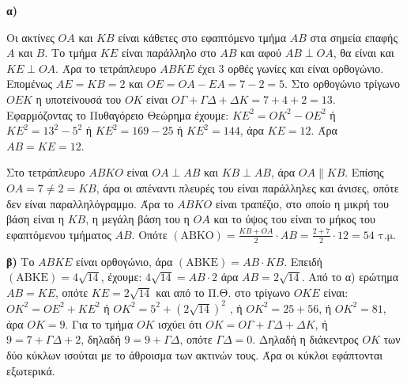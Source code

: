 \textbf{α)}
\begin{rlist}
    \item Οι ακτίνες $OA$ και $KB$ είναι κάθετες στο εφαπτόμενο τμήμα $AB$ στα σημεία επαφής $A$ και $B$. Το τμήμα $KE$ είναι παράλληλο στο $AB$ και αφού $AB \perp OA$, θα είναι και $KE \perp OA$. Άρα το τετράπλευρο $ABKE$ έχει 3 ορθές γωνίες και είναι ορθογώνιο. Επομένως $AE=KB=2$ και $OE=OA-EA=7-2=5$. Στο ορθογώνιο τρίγωνο $OEK$ η υποτείνουσά του $OK$ είναι $O\Gamma+\Gamma\Delta+\Delta K=7+4+2=13$. Εφαρμόζοντας το Πυθαγόρειο Θεώρημα έχουμε: $KE^2=OK^2-OE^2$ ή $KE^2=13^2-5^2$ ή $KE^2=169-25$ ή $KE^2=144$, άρα $KE=12$. Άρα $AB=KE=12$.
    \item Στο τετράπλευρο $ABKO$ είναι $OA \perp AB$ και $KB \perp AB$, άρα $OA \parallel KB$. Επίσης $OA=7 \neq 2=KB$, άρα οι απέναντι πλευρές του είναι παράλληλες και άνισες, οπότε δεν είναι παραλληλόγραμμο. Άρα το $ABKO$ είναι τραπέζιο, στο οποίο η μικρή του βάση είναι η $KB$, η μεγάλη βάση του η $OA$ και το ύψος του είναι το μήκος του εφαπτόμενου τμήματος $AB$. Οπότε $(\text{ABKO}) = \frac{KB+OA}{2} \cdot AB = \frac{2+7}{2} \cdot 12 = 54 \text{ τ.μ.}$
\end{rlist}
\textbf{β)} Το $ABKE$ είναι ορθογώνιο, άρα $(\text{ABKE}) = AB \cdot KB$. Επειδή $(\text{ABKE}) = 4\sqrt{14}$, έχουμε:
$4\sqrt{14} = AB \cdot 2$ άρα $AB = 2\sqrt{14}$. Από το α) ερώτημα $AB=KE$, οπότε $KE=2\sqrt{14}$ και από το Π.Θ. στο τρίγωνο $OKE$ είναι: $OK^2 = OE^2+KE^2$ ή $OK^2=5^2+(2\sqrt{14})^2$ , ή $OK^2 = 25+56$, ή $OK^2=81$, άρα $OK=9$. Για το τμήμα $OK$ ισχύει ότι $OK=O\Gamma+\Gamma\Delta+\Delta K$, ή $9=7+\Gamma\Delta+2$, δηλαδή $9=9+\Gamma\Delta$, οπότε $\Gamma\Delta=0$.
Δηλαδή η διάκεντρος $OK$ των δύο κύκλων ισούται με το άθροισμα των ακτινών τους. Άρα οι κύκλοι εφάπτονται εξωτερικά.